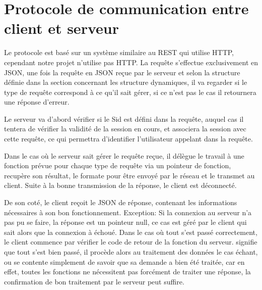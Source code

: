 % 
\section{Protocole de communication entre client et serveur}
Le protocole est basé sur un système similaire au REST qui utilise HTTP, cependant notre projet n'utilise pas HTTP.
La requête s'effectue exclusivement en JSON, une fois la requête en JSON reçue par le serveur et selon la structure définie dans la section concernant les structure dynamiques, il va regarder si le type de requête correspond à ce qu'il sait gérer, si ce n'est pas le cas il retournera une réponse d'erreur.\par
Le serveur va d'abord vérifier si le Sid est défini dans la requête, auquel cas il tentera de vérifier la validité de la session en cours, et associera la session avec cette requête, ce qui permettra d'identifier l'utilisateur appelant dans la requête.\par
Dans le cas où le serveur sait gérer le requête reçue, il délègue le travail à une fonction prévue pour chaque type de requête via un pointeur de fonction, recupère son résultat, le formate pour être envoyé par le réseau et le transmet au client. Suite à la bonne transmission de la réponse, le client est déconnecté.\par

De son coté, le client reçoit le JSON de réponse, contenant les informations nécessaires à son bon fonctionnement. Exception: Si la connexion au serveur n'a pas pu se faire, la réponse est un pointeur null, ce cas est géré par le client qui sait alors que la connexion à échoué. Dans le cas où tout s'est passé correctement, le client commence par vérifier le code de retour de la fonction du serveur.  \fg signifie que tout s'est bien passé, il procède alors au traitement des données le cas échant, ou se contente simplement de savoir que sa demande a bien été traitée, car en effet, toutes les fonctions ne nécessitent pas forcément de traiter une réponse, la confirmation de bon traitement par le serveur peut suffire.\par

